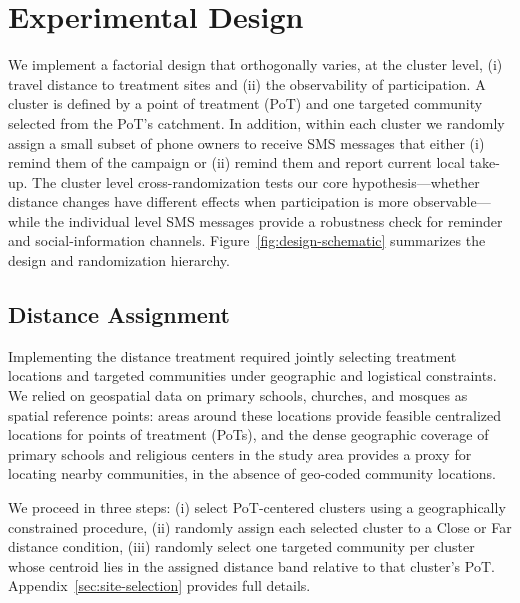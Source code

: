 
\section{Experimental Design} \label{design}

We implement a factorial design that orthogonally varies, at the cluster level, (i) travel distance to treatment sites and (ii) the observability of participation. A cluster is defined by a point of treatment (PoT) and one targeted community selected from the PoT's catchment. In addition, within each cluster we randomly assign a small subset of phone owners to receive SMS messages that either (i) remind them of the campaign or (ii) remind them and report current local take-up. The cluster level cross-randomization tests our core hypothesis---whether distance changes have different effects when participation is more observable---while the
individual level SMS messages provide a robustness check for reminder and social-information channels. Figure~\ref{fig:design-schematic} summarizes the design and randomization hierarchy.


\subsection{Distance Assignment}\label{sec:distance-treatment}

Implementing the distance treatment required jointly selecting treatment locations and targeted communities under geographic and logistical constraints. We relied on geospatial data on primary schools, churches, and mosques as spatial reference points: areas around these locations provide feasible centralized locations for points of treatment (PoTs), and the dense geographic coverage of primary schools and religious centers in the study area provides a proxy for locating nearby communities, in the absence of geo-coded community locations.

We proceed in three steps: (i) select PoT-centered clusters using a geographically constrained procedure, (ii) randomly assign each selected cluster to a Close or Far distance condition, (iii) randomly select one targeted community per cluster whose centroid lies in the assigned distance band relative to that cluster's PoT. Appendix~\ref{sec:site-selection} provides full details. %

